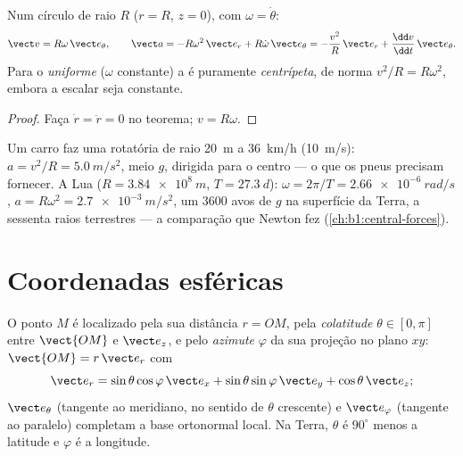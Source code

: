 \begin{corollary}\label{cor:b1:point-kinematics:circular}
Num círculo de raio $R$ ($r = R$, $z = 0$), com \emph{} $\omega = \dot\theta$:
\[
\vect v = R\omega\,\vect e_\theta, \qquad
\vect a = -R\omega^2\,\vect e_r + R\dot\omega\,\vect e_\theta
= -\frac{v^2}{R}\,\vect e_r + \frac{\dd v}{\dd t}\,\vect e_\theta .
\]
Para o  \emph{uniforme} ($\omega$ constante) a 
é puramente \emph{centrípeta}, de norma $v^2/R = R\omega^2$, embora a
 escalar seja constante.
\end{corollary}

\begin{proof}
Faça $\dot r = \ddot r = 0$ no teorema; $v = R\omega$.
\end{proof}

\begin{example}\label{ex:b1:point-kinematics:circles}
Um carro faz uma rotatória de raio \qty{20}{m} a \qty{36}{km/h}
(\qty{10}{m/s}): $a = v^2/R = \qty{5.0}{m/s^2}$, meio $g$, dirigida
para o centro --- o que os pneus precisam fornecer. A Lua
($R = \qty{3.84e8}{m}$, $T = \qty{27.3}{d}$): $\omega = 2\pi/T =
\qty{2.66e-6}{rad/s}$, $a = R\omega^2 = \qty{2.7e-3}{m/s^2}$, um
$3600$ avos de $g$ na superfície da Terra, a sessenta raios terrestres --- a
comparação que Newton fez (\cref{ch:b1:central-forces}).
\end{example}

\section{Coordenadas esféricas}

\begin{definition}\label{def:b1:point-kinematics:spherical}
O ponto $M$ é localizado pela sua distância $r = OM$, pela \emph{colatitude}
$\theta \in [0, \pi]$ entre $\vect{OM}$ e $\vect e_z$, e pelo
\emph{azimute} $\varphi$ da sua projeção no plano $xy$:
$\vect{OM} = r\,\vect e_r$ com
\[
\vect e_r = \sin\theta\cos\varphi\,\vect e_x + \sin\theta\sin\varphi\,\vect e_y + \cos\theta\,\vect e_z ;
\]
$\vect e_\theta$ (tangente ao meridiano, no sentido de $\theta$ crescente)
e $\vect e_\varphi$ (tangente ao paralelo) completam a base
ortonormal local. Na Terra, $\theta$ é $90^\circ$ menos a
latitude e $\varphi$ é a longitude.
\end{definition}

